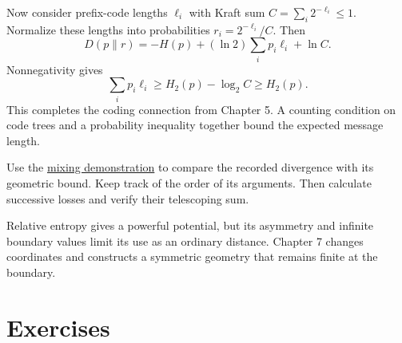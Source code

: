 \documentclass[11pt,oneside,openany]{book}
\theoremstyle{definition}
\theoremstyle{remark}
\numberwithin{equation}{chapter}
\begin{document}
Now consider prefix-code lengths \(\ell_i\) with Kraft sum \(C=\sum_i2^{-\ell_i}\leq1\). Normalize these lengths into probabilities \(r_i=2^{-\ell_i}/C\). Then \[D(p\|r)=-H(p)+(\ln2)\sum_i p_i\ell_i+\ln C.\] Nonnegativity gives \[\sum_i p_i\ell_i\geq H_2(p)-\log_2C\geq H_2(p).\] This completes the coding connection from Chapter 5. A counting condition on code trees and a probability inequality together bound the expected message length.

Use the \href{https://bobovski66.github.io/IntroDiscreteInfoGeom/demos/week06.html}{mixing demonstration} to compare the recorded divergence with its geometric bound. Keep track of the order of its arguments. Then calculate successive losses and verify their telescoping sum.

Relative entropy gives a powerful potential, but its asymmetry and infinite boundary values limit its use as an ordinary distance. Chapter 7 changes coordinates and constructs a symmetric geometry that remains finite at the boundary.

\section{Exercises}\label{ch06-exercises}
\end{document}
